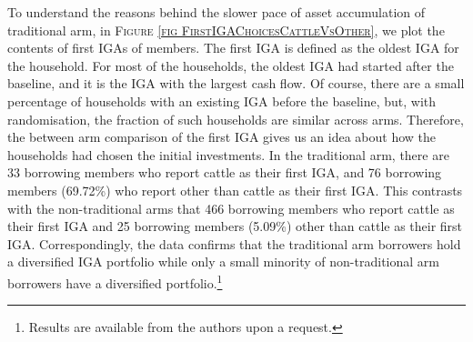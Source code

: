 	To understand the reasons behind the slower pace of asset accumulation of \textsf{traditional} arm, %
	in \textsc{\footnotesize Figure \ref{fig FirstIGAChoicesCattleVsOther}}, we plot the contents of first IGAs of members. The first IGA is defined as the oldest IGA for the household. For most of the households, the oldest IGA had started after the baseline, and it is the IGA with the largest cash flow. Of course, there are a small percentage of households with an existing IGA before the baseline, but, with randomisation, the fraction of such households are similar across arms. Therefore, the between arm comparison of the first IGA gives us an idea about how the households had chosen the initial investments. In the \textsf{traditional} arm, there are 33 borrowing members who report cattle as their first IGA, and 76 borrowing members (69.72\%) who report other than cattle as their first IGA. This contrasts with the non-\textsf{traditional} arms that 466 borrowing members who report cattle as their first IGA and 25 borrowing members (5.09\%) other than cattle as their first IGA. Correspondingly, the data confirms that the \textsf{traditional} arm borrowers hold a diversified IGA portfolio while only a small minority of non-\textsf{traditional} arm borrowers have a diversified portfolio.\footnote{Results are available from the authors upon a request. }

